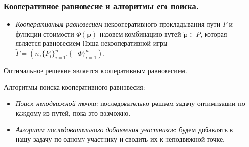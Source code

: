 \documentclass{beamer}
\begin{document}
\begin{frame}\frametitle{Кооперативное равновесие и алгоритмы его поиска.}
\begin{itemize}
\item \textit{Кооперативным равновесием} некооперативного прокладывания пути $F$ и функции стоимости $\Phi (\textbf{p})$ назовем комбинацию путей $\widetilde{\textbf{p}} \in P$, которая является равновесием Нэша некооперативной игры $\widetilde{\Gamma} = (n, \{P_i\}_{i = 1}^n, \{-\Phi\}_{i = 1}^n)$.
\end{itemize}

Оптимальное решение является кооперативным равновесием.

\bigskip
Алгоритмы поиска кооперативного равновесия:
\begin{itemize}
	\item \textit{Поиск неподвижной точки}: последовательно решаем задачу оптимизации по каждому из путей, пока это возможно. 
	\item  \textit{Алгоритм последовательного добавления участников}: будем добавлять в нашу задачу по одному участнику и сводить их к неподвижной точке.
\end{itemize}
\end{frame}
\end{document}
